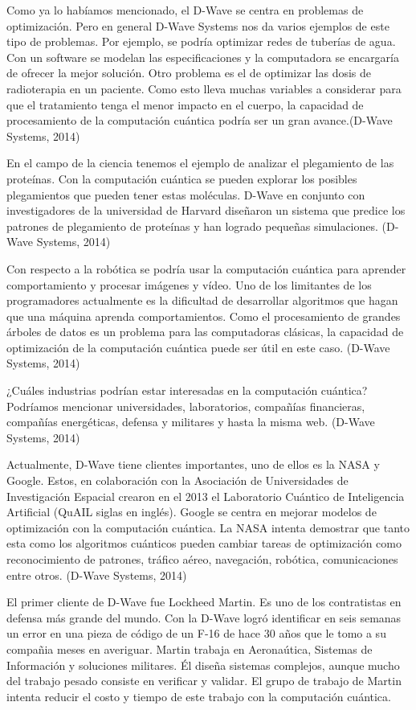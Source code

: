 \documentclass[11pt,a4paper]{article}
\begin{document}
Como ya lo habíamos mencionado, el D-Wave se centra en problemas de optimización. Pero en general D-Wave Systems nos da varios ejemplos de este tipo de problemas. Por ejemplo, se podría optimizar redes de tuberías de agua. Con un software se modelan las especificaciones y la computadora se encargaría de ofrecer la mejor solución. Otro problema es el de optimizar las dosis de radioterapia en un paciente. Como esto lleva muchas variables a considerar para que el tratamiento tenga el menor impacto en el cuerpo, la capacidad de procesamiento de la computación cuántica podría ser un gran avance.(D-Wave Systems, 2014)

En el campo de la ciencia tenemos el ejemplo de analizar el plegamiento de las proteínas. Con la computación cuántica se pueden explorar los posibles plegamientos que pueden tener estas moléculas. D-Wave en conjunto con investigadores de la universidad de Harvard diseñaron un sistema que predice los patrones de plegamiento de proteínas y han logrado pequeñas simulaciones. (D-Wave Systems, 2014)

Con respecto a la robótica se podría usar la computación cuántica para aprender comportamiento y procesar imágenes y vídeo. Uno de los limitantes de los programadores actualmente es la dificultad de desarrollar algoritmos que hagan que una máquina aprenda comportamientos. Como el procesamiento de grandes árboles de datos es un problema para las computadoras clásicas, la capacidad de optimización de la computación cuántica puede ser útil en este caso. (D-Wave Systems, 2014)

¿Cuáles industrias podrían estar interesadas en la computación cuántica? Podríamos mencionar universidades, laboratorios, compañías financieras, compañías energéticas, defensa y militares y hasta la misma web. (D-Wave Systems, 2014)

Actualmente, D-Wave tiene clientes importantes, uno de ellos es la NASA y Google. Estos, en colaboración con la Asociación de Universidades de Investigación Espacial crearon en el 2013 el Laboratorio Cuántico de Inteligencia Artificial (QuAIL siglas en inglés). Google se centra en mejorar modelos de optimización con la computación cuántica. La NASA intenta demostrar que tanto esta como los algoritmos cuánticos pueden cambiar tareas de optimización como reconocimiento de patrones, tráfico aéreo, navegación, robótica, comunicaciones entre otros. (D-Wave Systems, 2014)

El primer cliente de D-Wave fue Lockheed Martin. Es uno de los contratistas en defensa más grande del mundo. Con la D-Wave logró identificar en seis semanas un error en una pieza de código de un F-16 de hace 30 años que le tomo a su compañia meses en averiguar. Martin trabaja en Aeronaútica, Sistemas de Información y soluciones militares. Él diseña sistemas complejos, aunque mucho del trabajo pesado consiste en verificar y validar. El grupo de trabajo de Martin intenta reducir el costo y tiempo de este trabajo con la computación cuántica.
\end{document}
